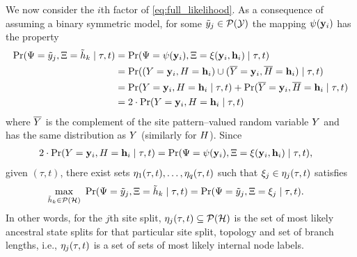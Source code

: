 We now consider the $i$th factor of \eqref{eq:full_likelihood}.
As a consequence of assuming a binary symmetric model, for some $\tilde{y}_j\in\mathcal{P}(\mathcal{Y})$ the mapping $\psi(\mathbf{y}_i)$ has the property
\begin{align*}
    \Pr(\Psi=\tilde{y}_j, \Xi=\tilde{h}_k \mid \tau, t) &= \Pr(\Psi=\psi(\mathbf{y}_i), \Xi=\xi(\mathbf{y}_i, \mathbf{h}_i) \mid \tau, t)\\
    &= \Pr((Y=\mathbf{y}_i, H=\mathbf{h}_i) \cup (\overline{Y}=\mathbf{y}_i, \overline{H}=\mathbf{h}_i) \mid \tau, t)\\
    &= \Pr(Y=\mathbf{y}_i, H=\mathbf{h}_i \mid \tau, t) + \Pr(\overline{Y}=\mathbf{y}_i, \overline{H}=\mathbf{h}_i \mid \tau, t)\\
    &= 2\cdot\Pr(Y=\mathbf{y}_i, H=\mathbf{h}_i \mid \tau, t)
\end{align*}
where $\overline{Y}$ is the complement of the site pattern--valued random variable $Y$ and has the same distribution as $Y$ (similarly for $H$).
Since
\begin{align*}
    2\cdot\Pr(Y=\mathbf{y}_i, H=\mathbf{h}_i \mid \tau, t) &= \Pr(\Psi=\psi(\mathbf{y}_i), \Xi=\xi(\mathbf{y}_i, \mathbf{h}_i) \mid \tau, t),
\end{align*}
given $(\tau, t)$, there exist sets $\eta_1(\tau, t),\ldots,\eta_q(\tau, t)$ such that $\xi_j\in\eta_j(\tau, t)$ satisfies
\begin{align*}
\max_{\ancestralSplit_k\in\mathcal{P}(\ancestralSplitSet)} \ \Pr(\siteSplitRV=\siteSplit_j, \ancestralSplitRV=\ancestralSplit_k \mid \tau, t) &= \Pr(\siteSplitRV=\siteSplit_j, \ancestralSplitRV = \xi_j \mid \tau, t).
\end{align*}
In other words, for the $j$th site split, $\eta_j(\tau, t)\subseteq\mathcal{P}(\mathcal{H})$ is the set of most likely ancestral state splits for that particular site split, topology and set of branch lengths, i.e., $\eta_j(\tau, t)$ is a set of sets of most likely internal node labels.
